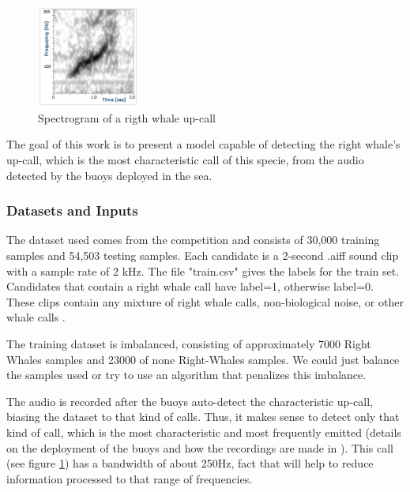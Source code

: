 \documentclass[]{article}
\begin{document}
\begin{figure}[htpb!]
\centering
\includegraphics[width= 0.3\textwidth]{images/sound_upcall_quiet.jpg}
\caption{Spectrogram of a rigth whale up-call \cite{CornellWeb} \label{img:upcall}}
\end{figure}
The goal of this work is to present a model capable of detecting the right whale's up-call, which is the most characteristic call of this specie, from the audio detected by the buoys deployed in the sea.
\subsubsection{Datasets and Inputs}\label{datasets-and-inputs}

The dataset used comes from the competition and consists of 30,000 training samples and 54,503 testing samples. Each candidate is a 2-second .aiff sound clip with a sample rate of 2 kHz. The file "train.csv" gives the labels for the train set. Candidates that contain a right whale call have label=1, otherwise label=0. These clips contain any mixture of right whale calls, non-biological noise, or other whale calls \cite{CornellWeb, CornellWeb2}. 

The training dataset is imbalanced, consisting of approximately 7000 Right Whales samples and 23000 of none Right-Whales samples. We could just balance the samples used or try to use an algorithm that penalizes this imbalance.

The audio is recorded after the buoys auto-detect the characteristic up-call, biasing the dataset to that kind of calls. Thus, it makes sense to detect only that kind of call, which is the most characteristic and most frequently emitted (details on the deployment of the buoys and how the recordings are made in \cite{McDonald2002}). This call (see figure \ref{img:upcall}) has a bandwidth of about 250Hz, fact that will help to reduce information processed to that range of frequencies.
\end{document}
